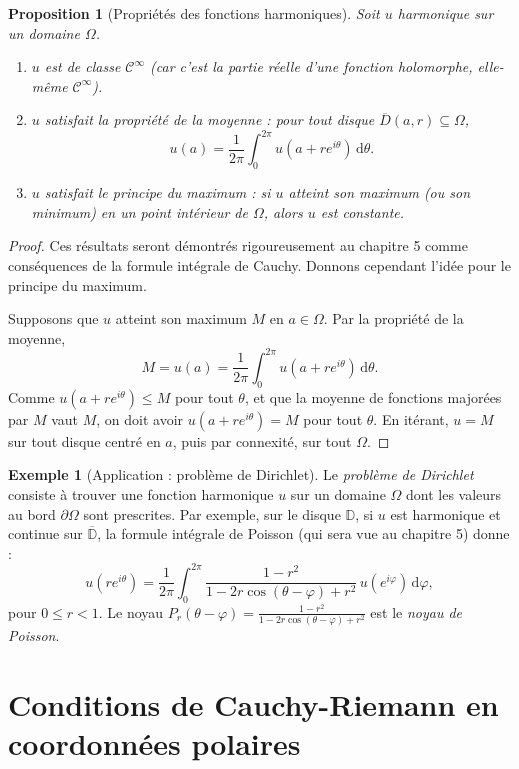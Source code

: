 \documentclass[12pt,a4paper,openany]{book}
\theoremstyle{definition}
\newtheorem{exemple}[definition]{Exemple}
\theoremstyle{plain}
\newtheorem{proposition}[definition]{Proposition}
\theoremstyle{remark}
\newcommand{\D}{\mathbb{D}}
\newcommand{\dd}{\mathrm{d}}
\newcommand{\conj}[1]{\overline{#1}}
\begin{document}
\begin{proposition}[Propriétés des fonctions harmoniques]\label{prop:harmoniques-proprietes}
Soit $u$ harmonique sur un domaine $\Omega$.
\begin{enumerate}[label=(\roman*)]
  \item $u$ est de classe $\mathscr{C}^\infty$ (car c'est la partie réelle d'une fonction holomorphe, elle-même $\mathscr{C}^\infty$).
  \item $u$ satisfait la propriété de la moyenne : pour tout disque $\conj{D}(a,r) \subseteq \Omega$,
  \[
    u(a) = \frac{1}{2\pi}\int_0^{2\pi} u(a + re^{i\theta})\,\dd\theta.
  \]
  \item $u$ satisfait le principe du maximum : si $u$ atteint son maximum (ou son minimum) en un point intérieur de $\Omega$, alors $u$ est constante.
\end{enumerate}
\end{proposition}

\begin{proof}
Ces résultats seront démontrés rigoureusement au chapitre 5 comme conséquences de la formule intégrale de Cauchy. Donnons cependant l'idée pour le principe du maximum.

Supposons que $u$ atteint son maximum $M$ en $a \in \Omega$. Par la propriété de la moyenne,
\[
  M = u(a) = \frac{1}{2\pi}\int_0^{2\pi} u(a+re^{i\theta})\,\dd\theta.
\]
Comme $u(a+re^{i\theta}) \leq M$ pour tout $\theta$, et que la moyenne de fonctions majorées par $M$ vaut $M$, on doit avoir $u(a+re^{i\theta}) = M$ pour tout $\theta$. En itérant, $u = M$ sur tout disque centré en $a$, puis par connexité, sur tout $\Omega$.
\end{proof}

\begin{exemple}[Application : problème de Dirichlet]\label{ex:dirichlet}
Le \emph{problème de Dirichlet} consiste à trouver une fonction harmonique $u$ sur un domaine $\Omega$ dont les valeurs au bord $\partial\Omega$ sont prescrites. Par exemple, sur le disque $\D$, si $u$ est harmonique et continue sur $\conj{\D}$, la formule intégrale de Poisson (qui sera vue au chapitre 5) donne :
\[
  u(re^{i\theta}) = \frac{1}{2\pi}\int_0^{2\pi} \frac{1 - r^2}{1 - 2r\cos(\theta-\varphi)+r^2}\, u(e^{i\varphi})\,\dd\varphi,
\]
pour $0 \leq r < 1$. Le noyau $P_r(\theta-\varphi) = \frac{1-r^2}{1-2r\cos(\theta-\varphi)+r^2}$ est le \emph{noyau de Poisson}.
\end{exemple}

\section{Conditions de Cauchy-Riemann en coordonnées polaires}\label{sec:CR-polaires}
\end{document}
